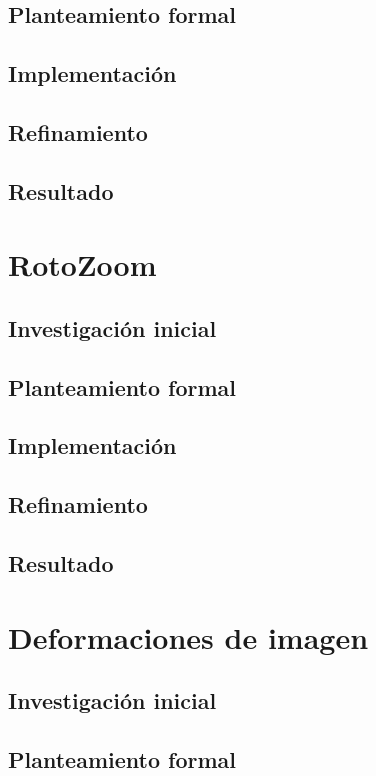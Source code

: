 \subsection{Planteamiento formal}
\subsection{Implementación}
\subsection{Refinamiento}
\subsection{Resultado}

\section{RotoZoom}

\subsection{Investigación inicial}
\subsection{Planteamiento formal}
\subsection{Implementación}
\subsection{Refinamiento}
\subsection{Resultado}

\section{Deformaciones de imagen}

\subsection{Investigación inicial}
\subsection{Planteamiento formal}
